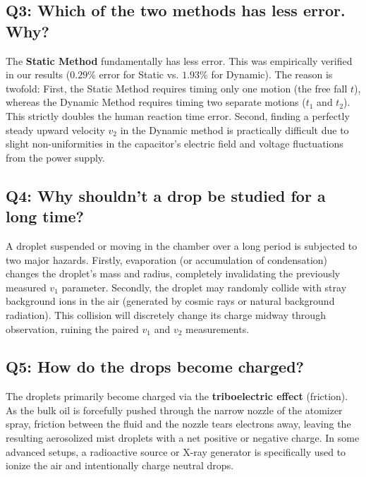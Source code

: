 \documentclass[a4paper,11pt]{article}
\begin{document}
\subsection*{Q3: Which of the two methods has less error. Why?}
The \textbf{Static Method} fundamentally has less error. This was empirically verified in our results ($0.29\%$ error for Static vs. $1.93\%$ for Dynamic). The reason is twofold:
First, the Static Method requires timing only one motion (the free fall $t$), whereas the Dynamic Method requires timing two separate motions ($t_1$ and $t_2$). This strictly doubles the human reaction time error. 
Second, finding a perfectly steady upward velocity $v_2$ in the Dynamic method is practically difficult due to slight non-uniformities in the capacitor's electric field and voltage fluctuations from the power supply.

\subsection*{Q4: Why shouldn't a drop be studied for a long time?}
A droplet suspended or moving in the chamber over a long period is subjected to two major hazards. Firstly, evaporation (or accumulation of condensation) changes the droplet's mass and radius, completely invalidating the previously measured $v_1$ parameter. Secondly, the droplet may randomly collide with stray background ions in the air (generated by cosmic rays or natural background radiation). This collision will discretely change its charge midway through observation, ruining the paired $v_1$ and $v_2$ measurements.

\subsection*{Q5: How do the drops become charged?}
The droplets primarily become charged via the \textbf{triboelectric effect} (friction). As the bulk oil is forcefully pushed through the narrow nozzle of the atomizer spray, friction between the fluid and the nozzle tears electrons away, leaving the resulting aerosolized mist droplets with a net positive or negative charge. In some advanced setups, a radioactive source or X-ray generator is specifically used to ionize the air and intentionally charge neutral drops.
\end{document}

